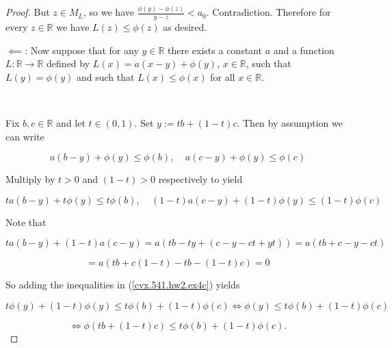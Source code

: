\begin{proof}
But \(z \in M_L\), so we have \( \frac{\phi(y) - \phi(z) }{y-z} < a_0 \). Contradiction. Therefore for every \(z \in \mathbb{R}\) we have \(L(z) \leq \phi(z)\) as desired.

\(\impliedby\): Now suppose that for any $y\in\mathbb{R}$ there exists a constant $a$ and a function $L:\mathbb{R}\to\mathbb{R}$ defined by $L(x)=a(x-y)+\phi(y)$, $x\in\mathbb{R}$, such that $L(y)=\phi(y)$ and such that $L(x)\leq\phi(x)$ for all $x\in\mathbb{R}$.

\

Fix \(b, c \in \mathbb{R}\) and let \(t \in (0,1)\). Set \(y:= tb + (1-t)c\). Then by assumption we can write

\[
a(b-y)+\phi(y) \leq \phi(b), \ \ \ \ \ a(c-y) + \phi(y) \leq \phi(c)
\]

Multiply by \(t > 0\) and \((1-t) > 0\) respectively to yield

\begin{equation}\label{cvx.541.hw2.ex4c}
ta(b-y)+ t\phi(y) \leq t\phi(b), \ \ \ \ \ (1-t)a(c-y) + (1-t)\phi(y) \leq (1-t)\phi(c)
\end{equation}

Note that 

\[
t a(b-y) + (1-t)a(c-y) = a(tb -ty + (c - y - ct + yt)) = a(tb  + c - y - ct )
\]

\[
= a(tb  + c(1-t) - tb - (1-t)c) = 0
\]

So adding the inequalities in (\ref{cvx.541.hw2.ex4c}) yields

\[
 t\phi(y) +  (1-t)\phi(y) \leq t\phi(b) + (1-t)\phi(c) \iff \phi(y) \leq  t\phi(b) + (1-t)\phi(c) 
\]

\[
\iff \phi( tb + (1-t)c  ) \leq  t\phi(b) + (1-t)\phi(c) .
\]

\end{proof}

